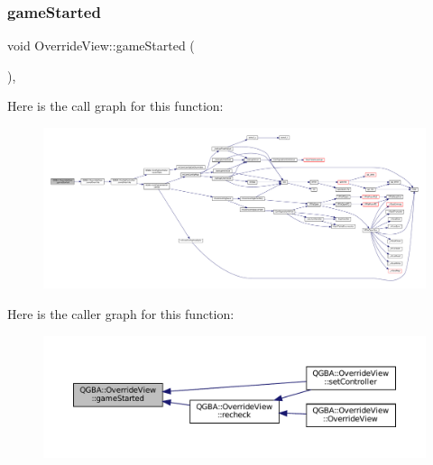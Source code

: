 \subsubsection{\texorpdfstring{game\+Started}{gameStarted}}
{\footnotesize\ttfamily void Override\+View\+::game\+Started (\begin{DoxyParamCaption}{ }\end{DoxyParamCaption})\hspace{0.3cm}{\ttfamily [private]}, {\ttfamily [slot]}}

Here is the call graph for this function\+:
\nopagebreak
\begin{figure}[H]
\begin{center}
\leavevmode
\includegraphics[width=350pt]{class_q_g_b_a_1_1_override_view_a0c94739bda5d5540784d4f1f72c88805_cgraph}
\end{center}
\end{figure}
Here is the caller graph for this function\+:
\nopagebreak
\begin{figure}[H]
\begin{center}
\leavevmode
\includegraphics[width=350pt]{class_q_g_b_a_1_1_override_view_a0c94739bda5d5540784d4f1f72c88805_icgraph}
\end{center}
\end{figure}
\mbox{\label{class_q_g_b_a_1_1_override_view_a4b01ad226af53be0d7454647e3a1c4ea}} 
